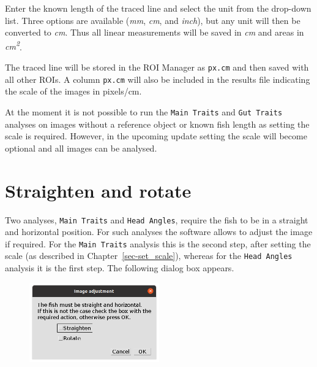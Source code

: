 \documentclass[
  letterpaper,
  DIV=11,
  numbers=noendperiod,
  oneside]{scrreprt}
\begin{document}
Enter the known length of the traced line and select the unit from the
drop-down list. Three options are available (\emph{mm}, \emph{cm}, and
\emph{inch}), but any unit will then be converted to \emph{cm}. Thus all
linear measurements will be saved in \emph{cm} and areas in
\emph{cm\textsuperscript{2}}.

The traced line will be stored in the ROI Manager as \texttt{px.cm} and
then saved with all other ROIs. A column \texttt{px.cm} will also be
included in the results file indicating the scale of the images in
pixels/cm.

\begin{tcolorbox}[standard jigsaw,arc=.35mm, toptitle=1mm, titlerule=0mm, bottomtitle=1mm, left=2mm, colbacktitle=quarto-callout-warning-color!10!white, colback=white, opacityback=0, leftrule=.75mm, title=\textcolor{quarto-callout-warning-color}{\faExclamationTriangle}\hspace{0.5em}{Warning}, coltitle=black, rightrule=.15mm, bottomrule=.15mm, toprule=.15mm, opacitybacktitle=0.6, colframe=quarto-callout-warning-color-frame]
At the moment it is not possible to run the \texttt{Main\ Traits} and
\texttt{Gut\ Traits} analyses on images without a reference object or
known fish length as setting the scale is required. However, in the
upcoming update setting the scale will become optional and all images
can be analysed.
\end{tcolorbox}

\hypertarget{sec-straighten_rotate}{%
\chapter{Straighten and rotate}\label{sec-straighten_rotate}}

Two analyses, \texttt{Main\ Traits} and \texttt{Head\ Angles}, require
the fish to be in a straight and horizontal position. For such analyses
the software allows to adjust the image if required. For the
\texttt{Main\ Traits} analysis this is the second step, after setting
the scale (as described in Chapter~\ref{sec-set_scale}), whereas for the
\texttt{Head\ Angles} analysis it is the first step. The following
dialog box appears.

\begin{figure}

{\centering \includegraphics[width=0.5\textwidth,height=\textheight]{./images/screenshots/adjust_image.png}

}

\end{figure}
\end{document}
